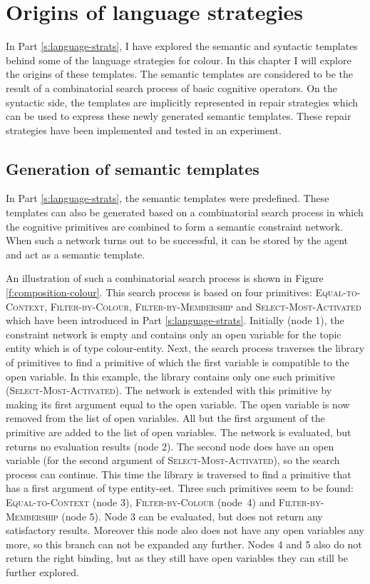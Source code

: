\chapter{Origins of language strategies}
\label{s:composition}

In Part \ref{s:language-strats}, I have explored the semantic and
syntactic templates behind some of the language strategies for
colour. In this chapter I will explore the origins of these
templates. The semantic templates are considered to be the result of a
combinatorial search process of basic cognitive operators. On the
syntactic side, the templates are implicitly represented in repair
strategies which can be used to express these newly generated semantic
templates. These repair strategies have been implemented and tested in
an experiment.

\section{Generation of semantic templates}

In Part \ref{s:language-strats}, the semantic templates were
predefined. These templates can also be generated based on a
combinatorial search process in which the cognitive primitives are
combined to form a semantic constraint network. When such a network
turns out to be successful, it can be stored by the agent and act as
a semantic template.

An illustration of such a combinatorial search process is shown in
Figure \ref{f:composition-colour}. This search process is based on
four primitives: \textsc{Equal-to-Context}, \textsc{Filter-by-Colour},
\textsc{Filter-by-Membership} and \textsc{Select-Most-Acti\-vated}
which have been introduced in Part \ref{s:language-strats}. Initially
(node 1), the constraint network is empty and contains only an open
variable for the topic entity which is of type colour-entity. Next,
the search process traverses the library of primitives to find a
primitive of which the first variable is compatible to the open
variable. In this example, the library contains only one such
primitive (\textsc{Select-Most-Activated}). The network is extended
with this primitive by making its first argument equal to the open
variable. The open variable is now removed from the list of open
variables. All but the first argument of the primitive are added to
the list of open variables. The network is evaluated, but returns no
evaluation results (node 2). The second node does have an open
variable (for the second argument of \textsc{Select-Most-Activated}),
so the search process can continue. This time the library is traversed
to find a primitive that has a first argument of type
entity-set. Three such primitives seem to be found:
\textsc{Equal-to-Context} (node 3), \textsc{Filter-by-Colour} (node~4)
and \textsc{Filter-by-Membership} (node 5). Node 3 can be evaluated,
but does not return any satisfactory results. Moreover this node also does not
have any open variables any more, so this branch can not be expanded
any further. Nodes 4 and 5 also do not return the right binding, but as
they still have open variables they can still be further explored.

